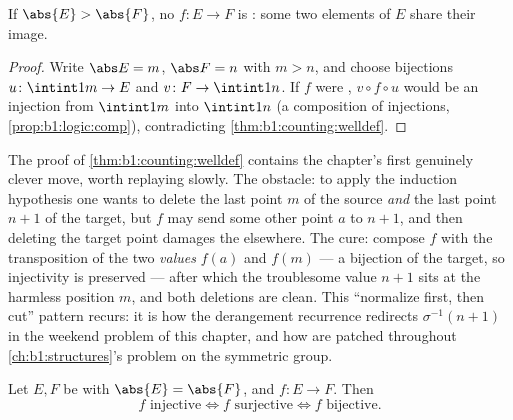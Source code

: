 \begin{corollary}\label{cor:b1:counting:pigeonhole}
If $\abs{E} > \abs{F}$, no  $f \colon E \to F$ is : some
two elements of $E$ share their image.
\end{corollary}

\begin{proof}
Write $\abs E = m$, $\abs F = n$ with $m > n$, and choose bijections
$u \colon \intint1m \to E$ and $v \colon F \to \intint1n$. If $f$
were , $v \circ f \circ u$ would be an injection from
$\intint1m$ into $\intint1n$ (a composition of injections,
\cref{prop:b1:logic:comp}), contradicting
\cref{thm:b1:counting:welldef}.
\end{proof}

\begin{remark}\label{rem:b1:counting:swapinterlude}
The proof of \cref{thm:b1:counting:welldef} contains the
chapter's first genuinely clever move, worth replaying slowly.
The obstacle: to apply the induction hypothesis one wants to
delete the last point $m$ of the source \emph{and} the last point
$n+1$ of the target, but $f$ may send some other point $a$ to $n
+ 1$, and then deleting the target point damages the 
elsewhere. The cure: compose $f$ with the transposition of the
two \emph{values} $f(a)$ and $f(m)$ --- a bijection of the
target, so injectivity is preserved --- after which the
troublesome value $n + 1$ sits at the harmless position $m$, and
both deletions are clean. This ``normalize first, then cut''
pattern recurs: it is how the derangement recurrence redirects
$\sigma^{-1}(n+1)$ in the weekend problem of this chapter, and
how  are patched throughout
\cref{ch:b1:structures}'s problem on the symmetric group.
\end{remark}

\begin{proposition}\label{prop:b1:counting:injsur}
Let $E, F$ be  with $\abs{E} = \abs{F}$, and $f \colon E
\to F$. Then
\[
f \text{ injective} \iff f \text{ surjective} \iff f \text{ bijective}.
\]
\end{proposition}

